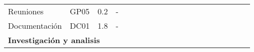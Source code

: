 \begin{longtable}[c]{llclllllllllllllllll}
        \multicolumn{1}{|l|}{Reuniones}                                                                                         & \multicolumn{1}{l|}{GP05}                                                      & \multicolumn{1}{c|}{0.2}                                                         & \multicolumn{1}{l|}{-}                                                               &                                 &                                 &                                 &                                 &                                 &                                 &                                 &                                 & \cellcolor[HTML]{EF8787}        &                                 &                                 &                                 &                                 &                                 & \multicolumn{1}{l|}{}                         &  \\ \cline{1-4}
        \multicolumn{1}{|l|}{Documentación}                                                                                     & \multicolumn{1}{l|}{DC01}                                                      & \multicolumn{1}{c|}{1.8}                                                         & \multicolumn{1}{l|}{-}                                                               & \cellcolor[HTML]{C9C9C9}        & \cellcolor[HTML]{C9C9C9}        & \cellcolor[HTML]{C9C9C9}        & \cellcolor[HTML]{C9C9C9}        & \cellcolor[HTML]{C9C9C9}        &                                 &                                 &                                 & \cellcolor[HTML]{C9C9C9}        & \cellcolor[HTML]{C9C9C9}        &                                 &                                 &                                 & \cellcolor[HTML]{C9C9C9}        & \multicolumn{1}{l|}{\cellcolor[HTML]{C9C9C9}} &  \\ \cline{1-19}
        \multicolumn{4}{|l|}{\textbf{Investigación y analisis}}                                                                                                                                                                                                                                                                                                                            & \multicolumn{15}{l|}{}                                                                                                                                                                                                                                                                                                                                                                                                                                                                                                                    &  \\ \cline{1-19}

\end{longtable}
